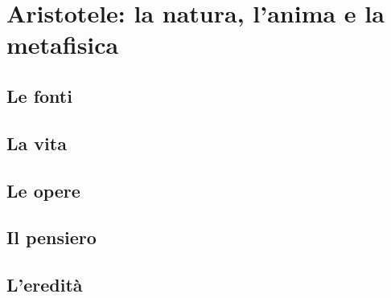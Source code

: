 \chapter{Aristotele: la natura, l'anima e la metafisica}

\section{Le fonti}

\section{La vita}

\section{Le opere}

\section{Il pensiero}

\section{L'eredità}
